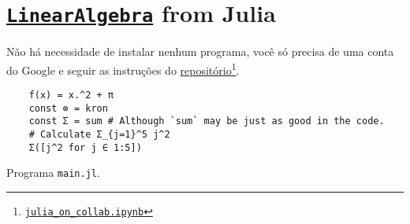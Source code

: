 \chapter{\href{https://docs.julialang.org/en/v1/stdlib/LinearAlgebra}{\texttt{LinearAlgebra}} from Julia}

Não há necessidade de instalar nenhum programa, você só precisa de
uma conta do Google e seguir as instruções do \href{https://github.com/Dsantra92/Julia-on-Colab}{repositório}\footnote{\href{https://colab.research.google.com/github/Dsantra92/Julia-on-Colab/blob/master/julia\_on\_collab.ipynb}{\texttt{julia\_on\_collab.ipynb}}}.

\begin{listing}[H]
  \footnotesize
  \begin{verbatim}
    f(x) = x.^2 + π
    const ⊗ = kron
    const Σ = sum # Although `sum` may be just as good in the code.
    # Calculate Σ_{j=1}^5 j^2
    Σ([j^2 for j ∈ 1:5])
    \end{verbatim}
  \caption{Programa \texttt{main.jl}.}
  \label{lst:3.1}
\end{listing}